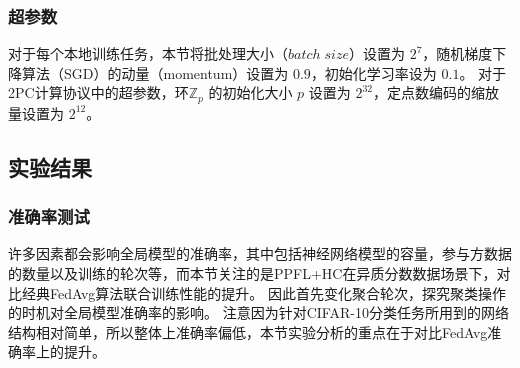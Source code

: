 \subsubsection{超参数}
对于每个本地训练任务，本节将批处理大小（$batch\;size$）设置为 $2^7$，随机梯度下降算法（SGD）的动量（momentum）设置为 $0.9$，初始化学习率设为 $0.1$。
对于2PC计算协议中的超参数，环$\mathbb{Z}_p$ 的初始化大小 $p$ 设置为 $2^{32}$，定点数编码的缩放量设置为 $2^{12}$。

\subsection{实验结果}

\subsubsection{准确率测试}

许多因素都会影响全局模型的准确率，其中包括神经网络模型的容量，参与方数据的数量以及训练的轮次等，而本节关注的是PPFL+HC在异质分数数据场景下，对比经典FedAvg算法联合训练性能的提升。
因此首先变化聚合轮次，探究聚类操作的时机对全局模型准确率的影响。
注意因为针对CIFAR-10分类任务所用到的网络结构相对简单，所以整体上准确率偏低，本节实验分析的重点在于对比FedAvg准确率上的提升。

